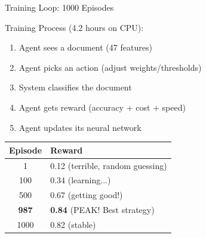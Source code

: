 \documentclass[aspectratio=169]{beamer}
\begin{document}
\begin{frame}{Training Loop: 1000 Episodes}
\begin{block}{Training Process (4.2 hours on CPU):}
\end{block}

\vspace{0.3cm}

\begin{enumerate}
    \item Agent sees a document (47 features)
    \item Agent picks an action (adjust weights/thresholds)
    \item System classifies the document
    \item Agent gets reward (accuracy + cost + speed)
    \item Agent updates its neural network
\end{enumerate}

\vspace{0.5cm}

\begin{table}
\centering
\begin{tabular}{cl}
\toprule
\textbf{Episode} & \textbf{Reward} \\
\midrule
1 & 0.12 \textcolor{errorred}{(terrible, random guessing)} \\
100 & 0.34 \textcolor{warningyellow}{(learning...)} \\
500 & 0.67 \textcolor{primaryblue}{(getting good!)} \\
\textbf{987} & \textbf{0.84} \textcolor{successgreen}{(PEAK! Best strategy)} \\
1000 & 0.82 \textcolor{successgreen}{(stable)} \\
\bottomrule
\end{tabular}
\end{table}
\end{frame}
\end{document}
